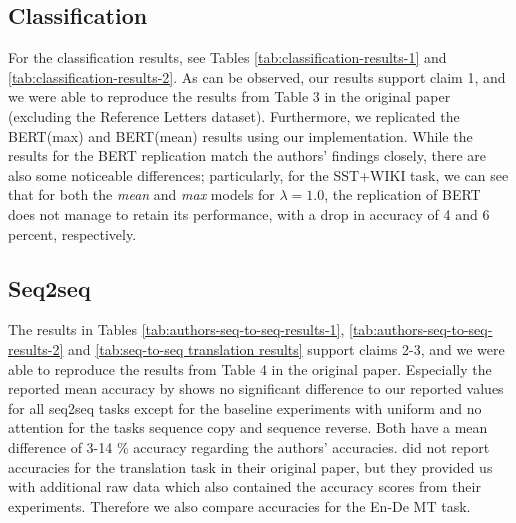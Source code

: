 
\subsection{Classification}
For the classification results, see Tables \ref{tab:classification-results-1} and \ref{tab:classification-results-2}. As can be observed, our results support claim 1, and we were able to reproduce the results from Table 3 in the original paper (excluding the Reference Letters dataset). Furthermore, we replicated the BERT(max) and BERT(mean) results using our implementation. While the results for the BERT replication match the authors' findings closely, there are also some noticeable differences; particularly, for the SST+WIKI task, we can see that for both the \textit{mean} and \textit{max} models for $\lambda = 1.0$, the replication of BERT does not manage to retain its performance, with a drop in accuracy of 4 and 6 percent, respectively.

\subsection{Seq2seq}
The results in Tables \ref{tab:authors-seq-to-seq-results-1}, \ref{tab:authors-seq-to-seq-results-2} and \ref{tab:seq-to-seq translation results} support claims 2-3, and we were able to reproduce the results from Table 4 in the original paper. Especially the reported mean accuracy by \citet{pruthi-etal-2020-learning} shows no significant difference to our reported values for all seq2seq tasks except for the baseline experiments with uniform and no attention for the tasks sequence copy and sequence reverse. Both have a mean difference of 3-14 \% accuracy regarding the authors' accuracies. \citet{pruthi-etal-2020-learning} did not report accuracies for the translation task in their original paper, but they provided us with additional raw data which also contained the accuracy scores from their experiments. Therefore we also compare accuracies for the En-De MT task.

